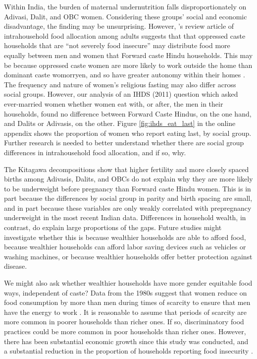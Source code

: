 \documentclass[12pt]{article}
\begin{document}
Within India, the burden of maternal undernutrition falls disproportionately on Adivasi, Dalit, and OBC women.  Considering these groups' social and economic disadvantage, the finding may be unsurprising.  However, \cite{harris2017determinants}'s review article of intrahousehold food allocation among adults suggests that that oppressed caste households that are ``not severely food insecure'' may distribute food more equally between men and women that Forward caste Hindu households.  This may be because oppressed caste women are more likely to work outside the home than dominant caste womorryen, and so have greater autonomy within their homes \citep{chakrabarty1996gender, eswaran2013status}.  The frequency and nature of women's religious fasting may also differ across social groups.  However, our analysis of an IHDS (2011) question which asked ever-married women whether women eat with, or after, the men in their households, found no difference between Forward Caste Hindus, on the one hand, and Dalits or Adivasis, on the other.  Figure \ref{fig:ihds_eat_last} in the online appendix shows the proportion of women who report eating last, by social group.  Further research is needed to better understand whether there are social group differences in intrahousehold food allocation, and if so, why.  

The Kitagawa decompositions show that higher fertility and more closely spaced births among Adivasis, Dalits, and OBCs do not explain why they are more likely to be underweight before pregnancy than Forward caste Hindu women.  This is in part because the differences by social group in parity and birth spacing are small, and in part because these variables are only weakly correlated with prepregnancy underweight in the most recent Indian data. Differences in household wealth, in contrast, do explain large proportions of the gaps.  Future studies might investigate whether this is because wealthier households are able to afford food, because wealthier households can afford labor saving devices such as vehicles or washing machines, or because wealthier households offer better protection against disease.  

We might also ask whether wealthier households have more gender equitable food ways, independent of caste?  Data from the 1980s suggest that women reduce on food consumption by more than men during times of scarcity to ensure that men have the energy to work \citep{behrman1990intrahousehold}.  It is reasonable to assume that periods of scarcity are more common in poorer households than richer ones.  If so, discriminatory food practices could be more common in poor households than richer ones.  However, there has been substantial economic growth since this study was conducted, and a substantial reduction in the proportion of households reporting food insecurity \citep{deaton2009food}. 
\end{document}
